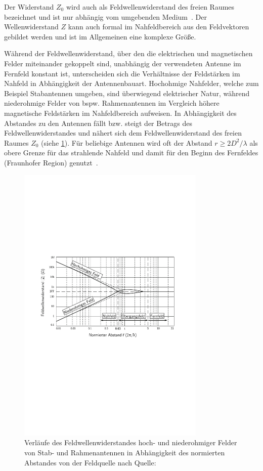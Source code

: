 Der Widerstand $Z_0$ wird auch als Feldwellenwiderstand des freien Raumes bezeichnet und ist nur abhängig vom umgebenden Medium~\cite{EMV}. Der Wellenwiderstand $Z$ kann auch formal im Nahfeldbereich aus den Feldvektoren gebildet werden und ist im Allgemeinen eine komplexe Größe.
\par
\vspace{\linespace}
Während der Feldwellenwiderstand, über den die elektrischen und magnetischen Felder miteinander gekoppelt sind, unabhängig der verwendeten Antenne im Fernfeld konstant ist, unterscheiden sich die Verhältnisse der Feldstärken im Nahfeld in Abhängigkeit der Antennenbauart. Hochohmige Nahfelder, welche zum Beispiel Stabantennen umgeben, sind überwiegend elektrischer Natur, während niederohmige Felder von bspw. Rahmenantennen im Vergleich höhere magnetische Feldstärken im Nahfeldbereich aufweisen. In Abhängigkeit des Abstandes zu den Antennen fällt bzw. steigt der Betrags des Feldwellenwiderstandes und nähert sich dem Feldwellenwiderstand des freien Raumes $Z_0$ (siehe \Abb \ref{fig:2_Feldwellenwiderstand}). Für beliebige Antennen wird oft der Abstand $r\geq 2 D^2 / \lambda$ als obere Grenze für das strahlende Nahfeld und damit für den Beginn des Fernfeldes (Fraunhofer Region) genutzt~\cite{Antenna_Theory}.  


\begin{figure}[ht]
    \centering
    \includegraphics[page=1, width=0.8\textwidth, trim = 1.3cm 8.5cm 1.5cm 7cm, clip]{Abbildungen/Kapitel2/Feldwellenwiderstand.pdf}
    \caption{Verläufe des Feldwellenwiderstandes hoch- und niederohmiger Felder von Stab- und Rahmenantennen in Abhängigkeit des normierten Abstandes von der Feldquelle nach Quelle:~\cite{EMV}}
    \label{fig:2_Feldwellenwiderstand}
\end{figure}


